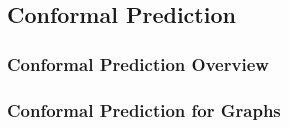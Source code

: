\subsection{Conformal Prediction}
\subsubsection{Conformal Prediction Overview}













\subsubsection{Conformal Prediction for Graphs}
